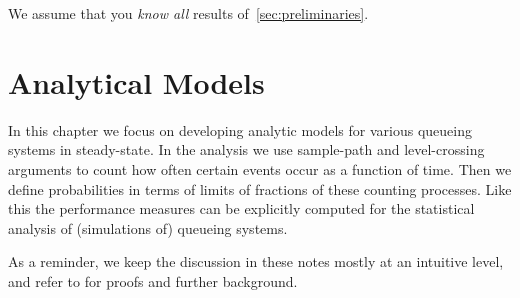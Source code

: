 We assume that you  \emph{know all} results of~\cref{sec:preliminaries}. 








\ifshowextra
   
\fi



\chapter{Analytical Models}
\label{cha:analytical-models}

In this chapter we focus on developing analytic models for various queueing systems in steady-state.
In the analysis we use sample-path and level-crossing arguments to count how often certain events occur as a function of time.
Then we define probabilities in terms of limits of fractions of these counting processes.
Like this the performance measures can be explicitly computed for the statistical analysis of (simulations of) queueing systems.


As a reminder, we keep the discussion in these notes mostly at an intuitive level, and refer to \cite{el-taha98:_sampl_path_analy_queuein_system} for proofs and further background.













% 
%


\ifshowextra
   
\fi

